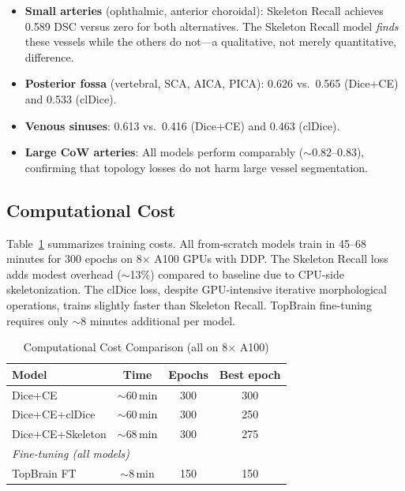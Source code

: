 \documentclass[conference]{IEEEtran}
\begin{document}
\begin{itemize}
    \item \textbf{Small arteries} (ophthalmic, anterior choroidal): Skeleton Recall achieves 0.589 DSC versus zero for both alternatives. The Skeleton Recall model \emph{finds} these vessels while the others do not---a qualitative, not merely quantitative, difference.
    \item \textbf{Posterior fossa} (vertebral, SCA, AICA, PICA): 0.626 vs.\ 0.565 (Dice+CE) and 0.533 (clDice).
    \item \textbf{Venous sinuses}: 0.613 vs.\ 0.416 (Dice+CE) and 0.463 (clDice).
    \item \textbf{Large CoW arteries}: All models perform comparably ($\sim$0.82--0.83), confirming that topology losses do not harm large vessel segmentation.
\end{itemize}

\subsection{Computational Cost}

Table~\ref{tab:compute} summarizes training costs. All from-scratch models train in 45--68 minutes for 300 epochs on 8$\times$ A100 GPUs with DDP. The Skeleton Recall loss adds modest overhead ($\sim$13\%) compared to baseline due to CPU-side skeletonization. The clDice loss, despite GPU-intensive iterative morphological operations, trains slightly faster than Skeleton Recall. TopBrain fine-tuning requires only $\sim$8 minutes additional per model.

\begin{table}[t]
\centering
\caption{Computational Cost Comparison (all on 8$\times$ A100)}
\label{tab:compute}
\begin{tabular}{lccc}
\toprule
\textbf{Model} & \textbf{Time} & \textbf{Epochs} & \textbf{Best epoch} \\
\midrule
Dice+CE          & $\sim$60\,min & 300 & 300 \\
Dice+CE+clDice   & $\sim$60\,min & 300 & 250 \\
Dice+CE+Skeleton & $\sim$68\,min & 300 & 275 \\
\midrule
\multicolumn{4}{l}{\textit{Fine-tuning (all models)}} \\
TopBrain FT      & $\sim$8\,min & 150 & 150 \\
\bottomrule
\end{tabular}
\end{table}
\end{document}
